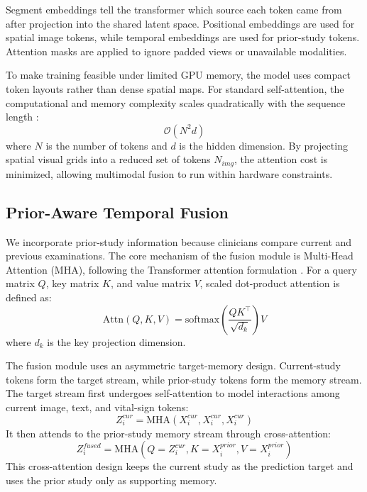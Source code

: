 Segment embeddings tell the transformer which source each token came from after projection into the shared latent space. Positional embeddings are used for spatial image tokens, while temporal embeddings are used for prior-study tokens. Attention masks are applied to ignore padded views or unavailable modalities.

To make training feasible under limited GPU memory, the model uses compact token layouts rather than dense spatial maps. For standard self-attention, the computational and memory complexity scales quadratically with the sequence length \cite{vaswani2017attention}:
\begin{equation}
    \mathcal{O}(N^2 d)
\end{equation}
where \(N\) is the number of tokens and \(d\) is the hidden dimension. By projecting spatial visual grids into a reduced set of tokens \(N_{img}\), the attention cost is minimized, allowing multimodal fusion to run within hardware constraints.

\subsection{Prior-Aware Temporal Fusion}
\label{subsec:method_prior_fusion}

We incorporate prior-study information because clinicians compare current and previous examinations. The core mechanism of the fusion module is Multi-Head Attention (MHA), following the Transformer attention formulation \cite{vaswani2017attention}. For a query matrix \(Q\), key matrix \(K\), and value matrix \(V\), scaled dot-product attention is defined as:
\begin{equation}
    \mathrm{Attn}(Q,K,V) = \mathrm{softmax}\left(\frac{QK^\top}{\sqrt{d_k}}\right)V
\end{equation}
where $d_k$ is the key projection dimension.

The fusion module uses an asymmetric target-memory design. Current-study tokens form the target stream, while prior-study tokens form the memory stream. The target stream first undergoes self-attention to model interactions among current image, text, and vital-sign tokens:
\begin{equation}
    Z_i^{cur} = \mathrm{MHA}(X_i^{cur}, X_i^{cur}, X_i^{cur})
\end{equation}
It then attends to the prior-study memory stream through cross-attention:
\begin{equation}
    Z_i^{fused} = \mathrm{MHA}(Q=Z_i^{cur}, K=X_i^{prior}, V=X_i^{prior})
\end{equation}
This cross-attention design keeps the current study as the prediction target and uses the prior study only as supporting memory.

